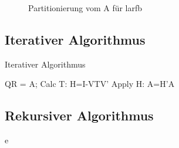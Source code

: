 \begin{figure} 
	\centering
	
	\caption{Partitionierung vom A für larfb}
	\label{fig:patrA}
\end{figure}


\subsection{Iterativer Algorithmus}
\begin{algorithm}
	\caption{Iterativer Algorithmus}
	\begin{algorithmic}
			\State QR = A;
				\State Calc T: H=I-VTV'
				\State Apply H: A=H'A
			\EndIf
		\EndFor
	\end{algorithmic}
\end{algorithm}


\subsection{Rekursiver Algorithmus}


e